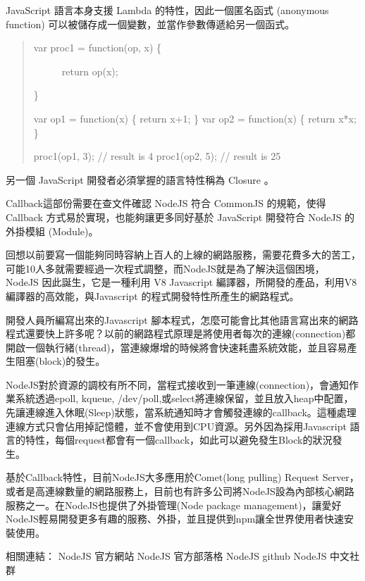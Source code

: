 \documentclass[a4paper,12pt,english]{sphinxmanual}
\begin{document}
JavaScript 語言本身支援 Lambda 的特性，因此一個匿名函式 (anonymous function) 可以被儲存成一個變數，並當作參數傳遞給另一個函式。
\begin{quote}
\begin{description}
\item[{var proc1 = function(op, x) \{}] \leavevmode
return op(x);

\end{description}

\}

var op1 = function(x) \{ return x+1; \}
var op2 = function(x) \{ return x*x; \}

proc1(op1, 3);  // result is 4
proc1(op2, 5);  // result is 25
\end{quote}

另一個 JavaScript 開發者必須掌握的語言特性稱為 Closure 。

Callback這部份需要在查文件確認
NodeJS 符合 CommonJS 的規範，使得 Callback 方式易於實現，也能夠讓更多同好基於 JavaScript 開發符合 NodeJS 的外掛模組 (Module)。

回想以前要寫一個能夠同時容納上百人的上線的網路服務，需要花費多大的苦工，可能10人多就需要經過一次程式調整，而NodeJS就是為了解決這個困境， NodeJS 因此誕生，它是一種利用 V8 Javascript 編譯器，所開發的產品，利用V8 編譯器的高效能，與Javascript 的程式開發特性所產生的網路程式。

開發人員所編寫出來的Javascript 腳本程式，怎麼可能會比其他語言寫出來的網路程式還要快上許多呢？以前的網路程式原理是將使用者每次的連線(connection)都開啟一個執行緒(thread)，當連線爆增的時候將會快速耗盡系統效能，並且容易產生阻塞(block)的發生。

NodeJS對於資源的調校有所不同，當程式接收到一筆連線(connection)，會通知作業系統透過epoll, kqueue, /dev/poll,或select將連線保留，並且放入heap中配置，先讓連線進入休眠(Sleep)狀態，當系統通知時才會觸發連線的callback。這種處理連線方式只會佔用掉記憶體，並不會使用到CPU資源。另外因為採用Javascript 語言的特性，每個request都會有一個callback，如此可以避免發生Block的狀況發生。

基於Callback特性，目前NodeJS大多應用於Comet(long pulling) Request Server，或者是高連線數量的網路服務上，目前也有許多公司將NodeJS設為內部核心網路服務之一。在NodeJS也提供了外掛管理(Node package management)，讓愛好NodeJS輕易開發更多有趣的服務、外掛，並且提供到npm讓全世界使用者快速安裝使用。

相關連結：
NodeJS 官方網站
NodeJS 官方部落格
NodeJS github
NodeJS 中文社群



\renewcommand{\indexname}{Index}
\printindex
\end{document}
